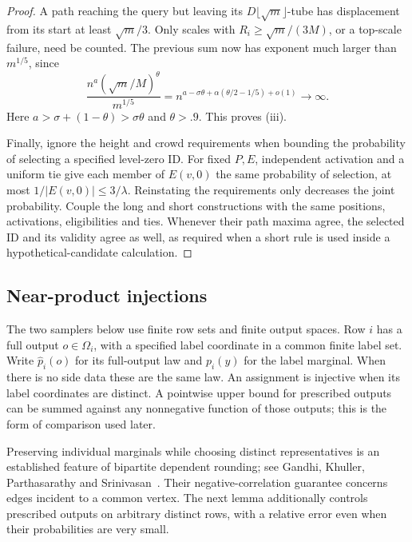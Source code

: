 \begin{proof}
A path reaching the query but leaving its
\(D\lfloor\sqrt m\rfloor\)-tube has displacement from its start at
least \(\sqrt m/3\). Only scales with
\(R_i\ge\sqrt m/(3M)\), or a top-scale failure, need be counted. The
previous sum now has exponent much larger than \(m^{1/5}\), since
\[
 \frac{n^a(\sqrt m/M)^\theta}{m^{1/5}}
  =n^{a-\sigma\theta+\alpha(\theta/2-1/5)+o(1)}\longrightarrow\infty.
\]
Here \(a>\sigma+(1-\theta)>\sigma\theta\) and \(\theta>.9\).
This proves (iii).

Finally, ignore the height and crowd requirements when bounding the
probability of selecting a specified level-zero ID. For fixed \(P,E\),
independent activation and a uniform tie give each member of \(E(v,0)\)
the same probability of selection, at most \(1/|E(v,0)|\le3/\lambda\).
Reinstating the requirements only decreases the joint probability.
Couple the long and short constructions with the same positions,
activations, eligibilities and ties. Whenever their path maxima agree,
the selected ID and its validity agree as well, as required when a short
rule is used inside a hypothetical-candidate calculation.
\end{proof}

\subsection{Near-product injections}
\label{sec:near-product-injections}

The two samplers below use finite row sets and finite output spaces. Row
\(i\) has a full output \(o\in\Omega_i\), with a specified label
coordinate in a common finite label set. Write \(\widehat p_i(o)\) for
its full-output law and \(p_i(y)\) for the label marginal. When there is
no side data these are the same law. An assignment is injective when its
label coordinates are distinct. A pointwise upper bound for prescribed
outputs can be summed against any nonnegative function of those outputs;
this is the form of comparison used later.

Preserving individual marginals while choosing distinct representatives is
an established feature of bipartite dependent rounding; see Gandhi,
Khuller, Parthasarathy and Srinivasan~\cite[Properties~(P1)--(P3)]{gandhi-khuller-parthasarathy-srinivasan2006}.
Their negative-correlation guarantee concerns edges incident to a common
vertex. The next lemma additionally controls prescribed outputs on
arbitrary distinct rows, with a relative error even when their
probabilities are very small.

